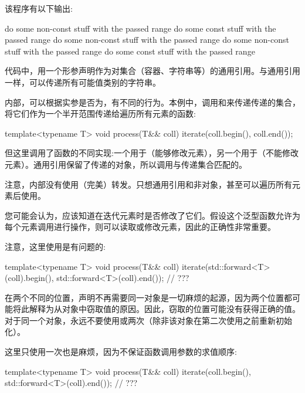 该程序有以下输出:

\begin{outputcode}
do some non-const stuff with the passed range
do some const stuff with the passed range
do some non-const stuff with the passed range
do some non-const stuff with the passed range
do some const stuff with the passed range
\end{outputcode}

代码中，用一个形参声明作为对集合（容器、字符串等）的通用引用。与通用引用一样，可以传递所有可能值类别的字符串。

内部，可以根据实参是否为，有不同的行为。本例中，调用和来传递传递的集合，将它们作为一个半开范围传递给遍历所有元素的函数:

\begin{cppcode}
template<typename T>
void process(T&& coll)
{
	iterate(coll.begin(), coll.end());
}
\end{cppcode}

但这里调用了函数的不同实现:一个用于（能够修改元素），另一个用于（不能修改元素）。通用引用保留了传递的对象，所以调用与传递集合匹配的。

注意，内部没有使用（完美）转发。只想通用引用和非对象，甚至可以遍历所有元素后使用。

您可能会认为，应该知道在迭代元素时是否修改了它们。假设这个泛型函数允许为每个元素调用进行操作，则可以读取或修改元素，因此的正确性非常重要。

注意，这里使用是有问题的:

\begin{cppcode}
template<typename T>
void process(T&& coll)
{
	iterate(std::forward<T>(coll).begin(), std::forward<T>(coll).end()); // ???
}
\end{cppcode}

在两个不同的位置，声明不再需要同一对象是一切麻烦的起源，因为两个位置都可能将此解释为从对象中窃取值的原因。因此，窃取的位置可能没有获得正确的值。对于同一个对象，永远不要使用或两次（除非该对象在第二次使用之前重新初始化）。

这里只使用一次也是麻烦，因为不保证函数调用参数的求值顺序:

\begin{cppcode}
template<typename T>
void process(T&& coll)
{
	iterate(coll.begin(), std::forward<T>(coll).end()); // ???
}
\end{cppcode}

